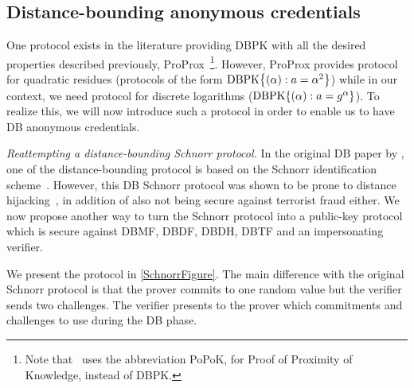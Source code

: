 \subsection{Distance-bounding anonymous credentials}%
\label{DB-anon-cred}


One protocol exists in the literature providing \ac{DBPK} with all the desired properties described previously, ProProx~\cite{ProProx}\footnote{Note that~\cite{ProProx} uses the abbreviation PoPoK, for Proof of Proximity of Knowledge, instead of \ac{DBPK}.}.
However, ProProx provides  protocol for quadratic residues (\ie protocols of the form \(\DBPK[\alpha][a = \alpha^2]\)) while in our context, we need  protocol for discrete logarithms (\ie \(\DBPK[\alpha][a = g^\alpha]\)).
To realize this, we will now introduce such a protocol in order to enable us to have \ac{DB} anonymous credentials.


\emph{Reattempting a distance-bounding Schnorr protocol.}
In the original \ac{DB} paper by \citet{DistanceBounding}, one of the distance-bounding protocol is based on the Schnorr identification scheme~\cite{Schnorr}.
However, this \ac{DB} Schnorr protocol was shown to be prone to distance hijacking~\cite{DistanceHijacking}, in addition of also not being secure against terrorist fraud either.
We now propose another way to turn the Schnorr protocol into a public-key  protocol which is secure against \ac{DBMF}, \ac{DBDF}, \ac{DBDH}, \ac{DBTF} and an impersonating verifier.

We present the protocol in \cref{SchnorrFigure}.
The main difference with the original Schnorr protocol is that the prover commits to one random value but the verifier sends two challenges.
The verifier presents to the prover which commitments and challenges to use during the \ac{DB} phase.

